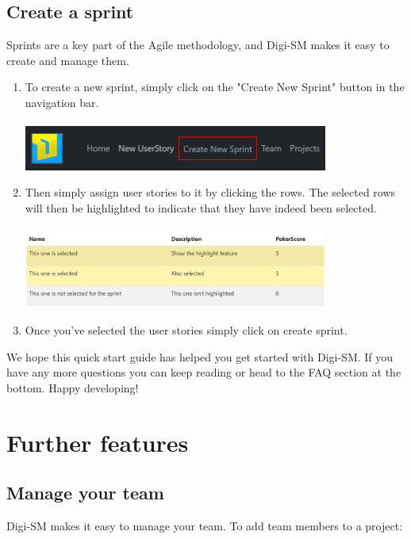 \documentclass{article}
\begin{document}
\subsection{Create a sprint}

Sprints are a key part of the Agile methodology, and Digi-SM makes it easy to create and manage them. 

\begin{enumerate}
    \item To create a new sprint, simply click on the "Create New Sprint" button in the navigation bar.\\\\
    \includegraphics[width=10cm]{sprintNav.png}
    \item Then simply assign user stories to it by clicking the rows. The selected rows will then be highlighted to indicate that they have indeed been selected.\\\\
    \includegraphics[width=10cm]{createSprint.png}
    \item  Once you’ve selected the user stories simply click on create sprint.
\end{enumerate}


We hope this quick start guide has helped you get started with Digi-SM. If you have any more questions you can keep reading or head to the FAQ section at the bottom. Happy developing!

\newpage

\section{Further features}

\subsection{Manage your team}

Digi-SM makes it easy to manage your team. To add team members to a project:
\end{document}
